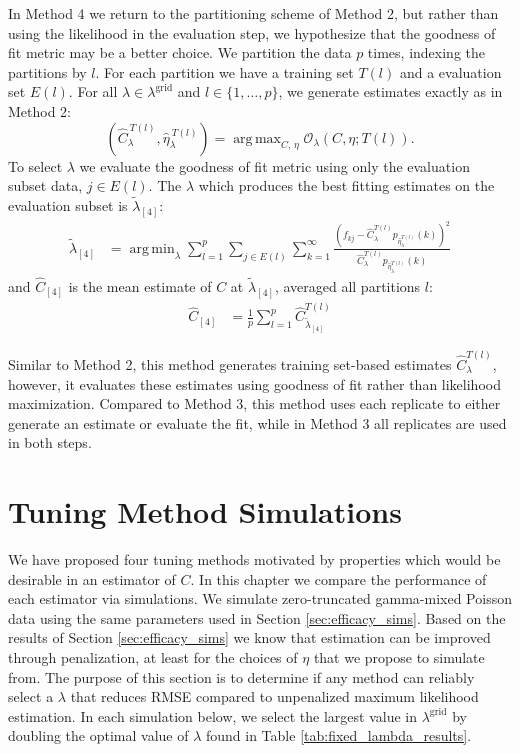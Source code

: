 \documentclass[12pt]{article}
\DeclareMathOperator*{\argmin}{arg\,min}
\DeclareMathOperator*{\argmax}{arg\,max}
\newcommand{\lambdagrid}{\lambda^{\text{grid}}}
\theoremstyle{break}
\theoremstyle{break}
\begin{document}
In Method 4 we return to the partitioning scheme of Method 2, but rather than using the likelihood in the evaluation step, we hypothesize that the goodness of fit metric may be a better choice.
We partition the data $p$ times, indexing the partitions by $l$. For each partition we have a training set $T(l)$ and a evaluation set $E(l)$.
For all $\lambda \in \lambdagrid$ and $l \in \{1, \dots , p \}$, we generate estimates exactly as in Method 2:
\begin{equation}
\left(\widehat{C}_{\lambda}^{ \ T(l)}, \widehat{\eta}_{\lambda}^{ \ T(l)} \right) = \argmax_{C, \, \eta} \mathcal{O}_\lambda \left(C, \eta; T(l) \right). \label{eq:c_hat_lambda_method_4}
\end{equation}
To select $\lambda$ we evaluate the goodness of fit metric using only the evaluation subset data, $j \in E(l)$.  The $\lambda$ which produces the best fitting estimates on the evaluation subset is $\widetilde{\lambda}_{[4]}$:
\begin{align}
\widetilde{\lambda}_{[4]} &= \argmin_{\lambda} \sum_{l = 1}^p \sum_{j \in E(l)} \sum_{k=1}^{\infty} \frac{ \left( f_{kj} - \widehat{C}_{\lambda}^{T(l)} p_{\widehat{\eta}_{\lambda}^{T(l)}}(k) \right)^2}{\widehat{C}_{\lambda}^{T(l)}p_{\widehat{\eta}_{\lambda}^{T(l)}}(k)}
\end{align}
and $\widehat{C}_{[4]}$ is the mean estimate of $C$ at  $\widetilde{\lambda}_{[4]}$, averaged all partitions $l$:
\begin{align}
\widehat{C}_{[4]} &= \frac{1}{p} \sum_{l=1}^p \widehat{C}_{\widetilde{\lambda}_{[4]}}^{T(l)}
\end{align}

Similar to Method 2, this method generates training set-based estimates $\widehat{C}^{T(l)}_{\lambda}$, however, it evaluates these estimates using goodness of fit rather than likelihood maximization.
Compared to Method 3, this method uses each replicate to either generate an estimate or evaluate the fit, while in Method 3 all replicates are used in both steps.

\section{Tuning Method Simulations}
\label{sec:tuning_simulations}

We have proposed four tuning methods motivated by properties which would be desirable in an estimator of $C$.  In this chapter we compare the performance of each estimator via simulations.
We simulate zero-truncated gamma-mixed Poisson data using the same parameters used in Section \ref{sec:efficacy_sims}.
Based on the results of Section \ref{sec:efficacy_sims} we know that estimation can be improved through penalization, at least for the choices of $\eta$ that we propose to simulate from.  The purpose of this section is to determine if any method can reliably select a $\lambda$ that reduces RMSE compared to unpenalized maximum likelihood estimation.
In each simulation below, we select the largest value in $\lambdagrid$ by doubling the optimal value of $\lambda$ found in Table \ref{tab:fixed_lambda_results}.
\end{document}
